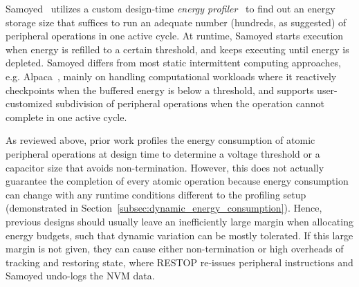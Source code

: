 Samoyed~\cite{maeng2019supporting} utilizes a custom design-time \textit{energy profiler}~\cite{colin2016energy-interference-free} to find out an energy storage size that suffices to run an adequate number (hundreds, as suggested) of peripheral operations in one active cycle. 
At runtime, Samoyed starts execution when energy is refilled to a certain threshold, and keeps executing until energy is depleted. 
Samoyed differs from most static intermittent computing approaches, e.g. Alpaca~\cite{maeng2017alpaca}, mainly on handling computational workloads where it reactively checkpoints when the buffered energy is below a threshold, and supports user-customized subdivision of peripheral operations when the operation cannot complete in one active cycle. 




As reviewed above, prior work profiles the energy consumption of atomic peripheral operations at design time to determine a voltage threshold or a capacitor size that avoids non-termination. 
However, this does not actually guarantee the completion of every atomic operation because energy consumption can change with any runtime conditions different to the profiling setup (demonstrated in Section~\ref{subsec:dynamic_energy_consumption}). 
Hence, previous designs should usually leave an inefficiently large margin when allocating energy budgets, such that dynamic variation can be mostly tolerated. 
If this large margin is not given, they can cause either non-termination or high overheads of tracking and restoring state, where RESTOP re-issues peripheral instructions and Samoyed undo-logs the NVM data. 


